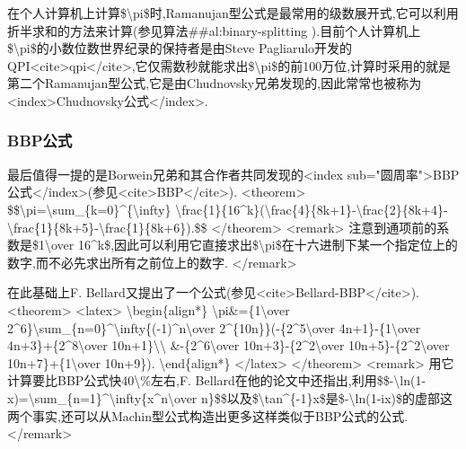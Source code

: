 \documentclass[
]{article}
\begin{document}
在个人计算机上计算\$\textbackslash pi\$时,Ramanujan型公式是最常用的级数展开式,它可以利用折半求和的方法来计算(参见算法\#\#al:binary-splitting
).目前个人计算机上\$\textbackslash pi\$的小数位数世界纪录的保持者是由Steve
Pagliarulo开发的QPI\textless cite\textgreater qpi\textless/cite\textgreater,它仅需数秒就能求出\$\textbackslash pi\$的前100万位,计算时采用的就是第二个Ramanujan型公式,它是由Chudnovsky兄弟发现的,因此常常也被称为\textless index\textgreater Chudnovsky公式\textless/index\textgreater.

\hypertarget{bbpux516cux5f0f}{%
\subsubsection{BBP公式}\label{bbpux516cux5f0f}}

最后值得一提的是Borwein兄弟和其合作者共同发现的\textless index
sub="圆周率"\textgreater BBP公式\textless/index\textgreater(参见\textless cite\textgreater BBP\textless/cite\textgreater).
\textless theorem\textgreater{}
\$\$\textbackslash pi=\textbackslash sum\_\{k=0\}\^{}\{\textbackslash infty\}
\textbackslash frac\{1\}\{16\^{}k\}(\textbackslash frac\{4\}\{8k+1\}-\textbackslash frac\{2\}\{8k+4\}-\textbackslash frac\{1\}\{8k+5\}-\textbackslash frac\{1\}\{8k+6\}).\$\$
\textless/theorem\textgreater{} \textless remark\textgreater{}
注意到通项前的系数是\$1\textbackslash over
16\^{}k\$,因此可以利用它直接求出\$\textbackslash pi\$在十六进制下某一个指定位上的数字,而不必先求出所有之前位上的数字.
\textless/remark\textgreater{}

在此基础上F.
Bellard又提出了一个公式(参见\textless cite\textgreater Bellard-BBP\textless/cite\textgreater).
\textless theorem\textgreater{} \textless latex\textgreater{}
\textbackslash begin\{align*\}
\textbackslash pi\&=\{1\textbackslash over
2\^{}6\}\textbackslash sum\_\{n=0\}\^{}\textbackslash infty\{(-1)\^{}n\textbackslash over
2\^{}\{10n\}\}(-\{2\^{}5\textbackslash over
4n+1\}-\{1\textbackslash over 4n+3\}+\{2\^{}8\textbackslash over
10n+1\}\textbackslash\textbackslash{} \&-\{2\^{}6\textbackslash over
10n+3\}-\{2\^{}2\textbackslash over 10n+5\}-\{2\^{}2\textbackslash over
10n+7\}+\{1\textbackslash over 10n+9\}). \textbackslash end\{align*\}
\textless/latex\textgreater{} \textless/theorem\textgreater{}
\textless remark\textgreater{}
用它计算要比BBP公式快40\textbackslash\%左右,F.
Bellard在他的论文中还指出,利用\$\$-\textbackslash ln(1-x)=\textbackslash sum\_\{n=1\}\^{}\textbackslash infty\{x\^{}n\textbackslash over
n\}\$\$以及\$\textbackslash tan\^{}\{-1\}x\$是\$-\textbackslash ln(1-ix)\$的虚部这两个事实,还可以从Machin型公式构造出更多这样类似于BBP公式的公式.
\textless/remark\textgreater{}
\end{document}
